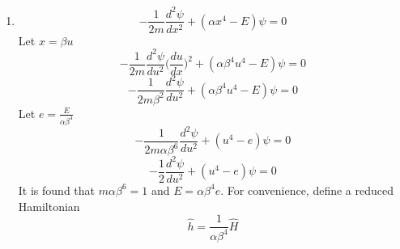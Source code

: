 \begin{sol}
\begin{enumerate}[label=\textbf{(\alph*)}]
\item
\begin{equation}
	-\frac{1}{2m}\frac{d^2\psi}{dx^2}+(\alpha x^4-E)\psi=0
\end{equation}
Let $x=\beta u$
\begin{equation}
	-\frac{1}{2m}\frac{d^2\psi}{du^2}\Big(\frac{du}{dx}\Big) ^2+(\alpha \beta^4u^4-E)\psi=0
\end{equation}
\begin{equation}
	-\frac{1}{2m\beta^2}\frac{d^2\psi}{du^2}+(\alpha\beta^4u^4-E)\psi=0
\end{equation}
Let $e=\frac{E}{\alpha\beta^4}$ 
\begin{equation}
	-\frac{1}{2m\alpha\beta^6}\frac{d^2\psi}{du^2}+(u^4-e)\psi=0
\end{equation}
\begin{equation}
	-\frac{1}{2}\frac{d^2\psi}{du^2}+(u^4-e)\psi=0
\end{equation}
It is found that $m\alpha\beta^6=1$ and $E=\alpha\beta^4e$. For convenience, define a reduced Hamiltonian
\begin{equation}
	\hat h=\frac{1}{\alpha\beta^4}\hat H
\end{equation}


\end{enumerate}
\end{sol}
